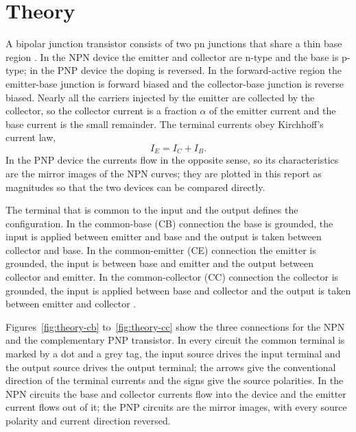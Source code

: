 \documentclass[12pt,a4paper]{article}
\begin{document}
	\section{Theory}\label{sec:theory}
	A bipolar junction transistor consists of two pn junctions that share a
	thin base region \cite{ref:sedra}. In the NPN device the emitter and
	collector are n-type and the base is p-type; in the PNP device the doping
	is reversed. In the forward-active region the emitter-base junction is
	forward biased and the collector-base junction is reverse biased. Nearly
	all the carriers injected by the emitter are collected by the collector,
	so the collector current is a fraction $\alpha$ of the emitter current
	and the base current is the small remainder. The terminal currents obey
	Kirchhoff's current law,
	\begin{equation}
		I_E = I_C + I_B .
		\label{eq:kcl}
	\end{equation}
	In the PNP device the currents flow in the opposite sense, so its
	characteristics are the mirror images of the NPN curves; they are plotted
	in this report as magnitudes so that the two devices can be compared
	directly.

	The terminal that is common to the input and the output defines the
	configuration. In the common-base (CB) connection the base is grounded,
	the input is applied between emitter and base and the output is taken
	between collector and base. In the common-emitter (CE) connection the
	emitter is grounded, the input is between base and emitter and the output
	between collector and emitter. In the common-collector (CC) connection
	the collector is grounded, the input is applied between base and
	collector and the output is taken between emitter and collector
	\cite{ref:theraja}.

	Figures~\ref{fig:theory-cb} to~\ref{fig:theory-cc} show the three
	connections for the NPN and the complementary PNP transistor. In every
	circuit the common terminal is marked by a dot and a grey tag, the input
	source drives the input terminal and the output source drives the output
	terminal; the arrows give the conventional direction of the terminal
	currents and the signs give the source polarities. In the NPN circuits the
	base and collector currents flow into the device and the emitter current
	flows out of it; the PNP circuits are the mirror images, with every source
	polarity and current direction reversed.
	\newpage
	
\end{document}
